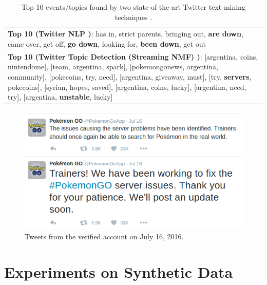 \documentclass[twoside,leqno,twocolumn]{article}\usepackage[]{graphicx}\usepackage[]{color}
\makeatletter
\def\maxwidth{ %
  \ifdim\Gin@nat@width>\linewidth
    \linewidth
  \else
    \Gin@nat@width
  \fi
}
\makeatother
\begin{document}
\begin{table}[h!]
  \footnotesize
  \centering
  \begin{tabular}{|p{8cm}|}
    \hline
    \textbf{Top 10 (Twitter NLP \cite{ritter2012open})}: has in, strict parents, bringing out, \textbf{are down}, came over, get off, \textbf{go down}, looking for, \textbf{been down}, get out \\
    \textbf{Top 10 (Twitter Topic Detection (Streaming NMF) \cite{hayashi2015real})}: [argentina, coins, nintendome], [team, argentina, spark], [pokemongonews, argentina, community], [pokecoins, try, need], [argentina, giveaway, must], [try, \textbf{servers}, pokecoins], [syrian, hopes, saved], [argentina, coins, lucky], [argentina, need, try], [argentina, \textbf{unstable}, lucky]\\
    \hline
  \end{tabular}
  \caption{Top 10 events/topics found by two state-of-the-art Twitter text-mining techniques \cite{hayashi2015real,  ritter2012open}.}
  \label{tab:top10NlpPokemon}
\end{table}

\begin{figure}[h!]
  \centering
  \includegraphics[width=0.8\maxwidth]{graphics/TwitterPostsPokemon.png} \caption[Tweets from the verified \@PokemonGoApp account on July 16, 2016.]{Tweets from the verified \@PokemonGoApp account on July 16, 2016.}\label{fig:twitter-pokemongoapp-tweets}
\end{figure}


\section{Experiments on Synthetic Data}
\label{sec:synth-exper}
\end{document}

